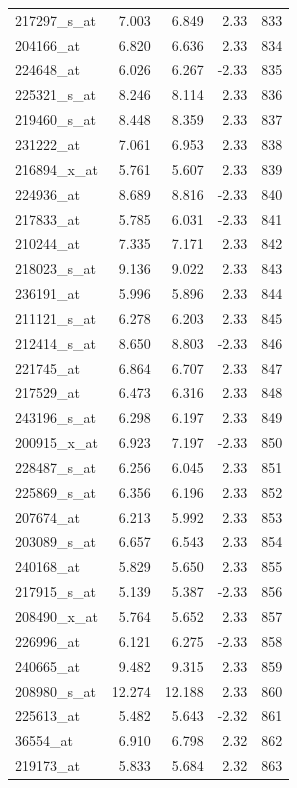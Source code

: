 \begin{footnotesize}
\begin{longtable}{lrrrr}
217297\_s\_at & 7.003 & 6.849 & 2.33 & 833 \\
204166\_at & 6.820 & 6.636 & 2.33 & 834 \\
224648\_at & 6.026 & 6.267 & -2.33 & 835 \\
225321\_s\_at & 8.246 & 8.114 & 2.33 & 836 \\
219460\_s\_at & 8.448 & 8.359 & 2.33 & 837 \\
231222\_at & 7.061 & 6.953 & 2.33 & 838 \\
216894\_x\_at & 5.761 & 5.607 & 2.33 & 839 \\
224936\_at & 8.689 & 8.816 & -2.33 & 840 \\
217833\_at & 5.785 & 6.031 & -2.33 & 841 \\
210244\_at & 7.335 & 7.171 & 2.33 & 842 \\
218023\_s\_at & 9.136 & 9.022 & 2.33 & 843 \\
236191\_at & 5.996 & 5.896 & 2.33 & 844 \\
211121\_s\_at & 6.278 & 6.203 & 2.33 & 845 \\
212414\_s\_at & 8.650 & 8.803 & -2.33 & 846 \\
221745\_at & 6.864 & 6.707 & 2.33 & 847 \\
217529\_at & 6.473 & 6.316 & 2.33 & 848 \\
243196\_s\_at & 6.298 & 6.197 & 2.33 & 849 \\
200915\_x\_at & 6.923 & 7.197 & -2.33 & 850 \\
228487\_s\_at & 6.256 & 6.045 & 2.33 & 851 \\
225869\_s\_at & 6.356 & 6.196 & 2.33 & 852 \\
207674\_at & 6.213 & 5.992 & 2.33 & 853 \\
203089\_s\_at & 6.657 & 6.543 & 2.33 & 854 \\
240168\_at & 5.829 & 5.650 & 2.33 & 855 \\
217915\_s\_at & 5.139 & 5.387 & -2.33 & 856 \\
208490\_x\_at & 5.764 & 5.652 & 2.33 & 857 \\
226996\_at & 6.121 & 6.275 & -2.33 & 858 \\
240665\_at & 9.482 & 9.315 & 2.33 & 859 \\
208980\_s\_at & 12.274 & 12.188 & 2.33 & 860 \\
225613\_at & 5.482 & 5.643 & -2.32 & 861 \\
36554\_at & 6.910 & 6.798 & 2.32 & 862 \\
219173\_at & 5.833 & 5.684 & 2.32 & 863 \\

\end{longtable}
\end{footnotesize}

